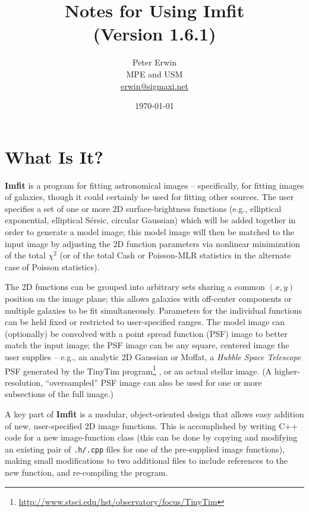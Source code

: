 \documentclass[10pt,a4paper,article]{memoir}
\newcommand{\imfit}{\textbf{Imfit}}
\newcommand{\Imfit}{\textbf{Imfit}}
\newcommand{\chisquare}{\ensuremath{\chi^{2}}}
\newcommand{\versionnum}{1.6.1}
\begin{document}
\title{
  Notes for Using Imfit \\
  (Version \versionnum{})
}
\author{
  Peter Erwin\\
  MPE and USM\\
  \href{mailto:erwin@sigmaxi.net}{erwin@sigmaxi.net}
}
\date{\today}  %

\maketitle

\tableofcontents


\newpage

\chapter{What Is It?}

\Imfit{} is a program for fitting astronomical images -- specifically,
for fitting images of galaxies, though it could certainly be used for
fitting other sources. The user specifies a set of one or more 2D
surface-brightness functions (e.g., elliptical exponential, elliptical
S\'ersic, circular Gaussian) which will be added together in order to
generate a model image; this model image will then be matched to the
input image by adjusting the 2D function parameters via nonlinear
minimization of the total \chisquare{} (or of the total Cash or
Poisson-MLR statistics in the alternate case of Poisson statistics).

The 2D functions can be grouped into arbitrary sets sharing a common $(x,y)$
position on the image plane; this allows galaxies with off-center components
or multiple galaxies to be fit simultaneously. Parameters for the individual
functions can be held fixed or restricted to user-specified ranges. The
model image can (optionally) be convolved with a point spread
function (PSF) image to better match the input image; the PSF image can
be any square, centered image the user supplies -- e.g., an analytic 2D Gaussian
or Moffat, a \textit{Hubble Space Telescope} PSF generated by the TinyTim
program\footnote{\url{http://www.stsci.edu/hst/observatory/focus/TinyTim}} \citep{krist95}, 
or an actual stellar image. (A higher-resolution, ``oversampled'' PSF image
can also be used for one or more subsections of the full image.) 

A key part of \imfit{} is a modular, object-oriented design that allows easy
addition of new, user-specified 2D image functions. This is accomplished by
writing C++ code for a new image-function class (this can be done by copying and
modifying an existing pair of \texttt{.h/.cpp} files for one of the pre-supplied
image functions), making small modifications to two additional files to include
references to the new function, and re-compiling the program.
\end{document}
